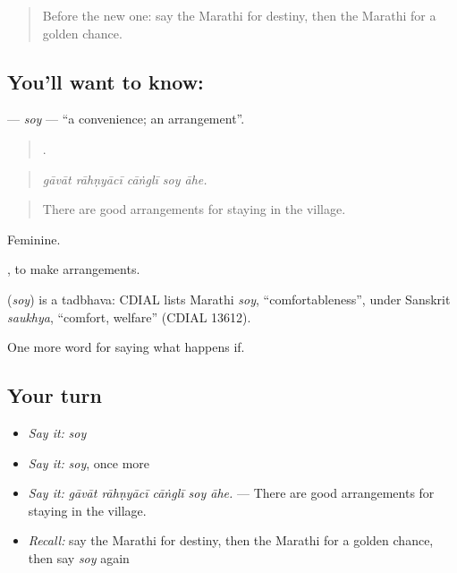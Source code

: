 \label{lesson:MR-C545-soy}



\begin{quote}
Before the new one: say the Marathi for destiny, then the Marathi for a golden chance.
\end{quote}

\subsection*{You'll want to know: }
\textbf{} — \emph{soy} — \textquotedblleft{}a convenience; an arrangement\textquotedblright{}.

\begin{quote}
    .
\end{quote}

\begin{quote}
\emph{gāvāt rāhṇyācī cāṅglī soy āhe.}
\end{quote}

\begin{quote}
There are good arrangements for staying in the village.
\end{quote}

Feminine.

 , to make arrangements.

\begin{cousinweb}
\textbf{} (\emph{soy}) is a tadbhava: CDIAL lists Marathi \emph{soy}, \textquotedblleft{}comfortableness\textquotedblright{}, under Sanskrit \emph{saukhya}, \textquotedblleft{}comfort, welfare\textquotedblright{} (CDIAL 13612).
\end{cousinweb}

\begin{grammarlens}[title={What you've built}]
One more word for saying what happens if.
\end{grammarlens}

\subsection*{Your turn}
\begin{itemize}
\raggedright
  \item \emph{Say it:} \emph{soy}
  \item \emph{Say it:} \emph{soy}, once more
  \item \emph{Say it:} \emph{gāvāt rāhṇyācī cāṅglī soy āhe.} — There are good arrangements for staying in the village.
  \item \emph{Recall:} say the Marathi for destiny, then the Marathi for a golden chance, then say \emph{soy} again
\end{itemize}

